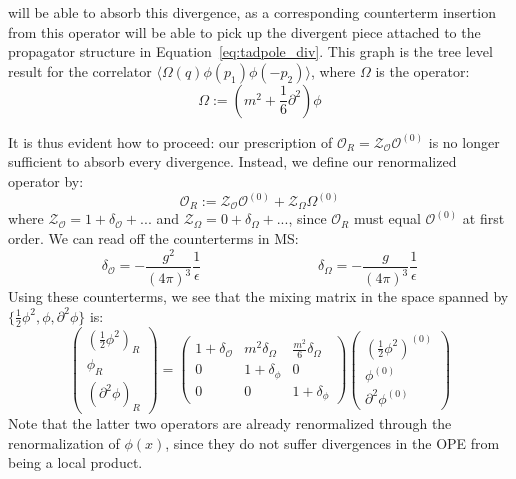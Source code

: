 \documentclass[11pt, oneside]{article}   	%
\theoremstyle{definition}
\begin{document}
will be able to absorb this divergence, as a corresponding counterterm insertion from this operator will be able to pick up 
the divergent piece attached to the propagator structure in Equation~\ref{eq:tadpole_div}. This graph is the tree level 
result for the correlator $\langle \Omega(q) \phi(p_1)\phi(-p_2)\rangle$, where $\Omega$ is the operator:
\begin{equation}
	\Omega := \left(m^2 + \frac{1}{6}\partial^2\right) \phi
\end{equation}

It is thus evident how to proceed: our prescription of $\mathcal O_R = \mathcal Z_\mathcal{O} \mathcal O^{(0)}$ is no 
longer sufficient to absorb every divergence. Instead, we define our renormalized operator by:
\begin{equation}
	\mathcal O_R := \mathcal Z_\mathcal{O} \mathcal O^{(0)} + \mathcal Z_\Omega \Omega^{(0)}
\end{equation}
where $\mathcal Z_\mathcal{O} = 1 + \delta_\mathcal{O} + ... $ and $\mathcal Z_\Omega = 0 + \delta_\Omega + ...$, 
since $\mathcal O_R$ must equal $\mathcal O^{(0)}$ at first order. We can read off the counterterms in MS:
\begin{equation}
	\delta_\mathcal{O} = -\frac{g^2}{(4\pi)^3}\frac{1}{\epsilon} \;\;\;\;\;\;\;\;\;\;\;\;\;\;\;\;\;\;\;\;\;\;\;\;\;\;\;\;\;\;
	\delta_\Omega = -\frac{g}{(4\pi)^3}\frac{1}{\epsilon}
\end{equation}
Using these counterterms, we see that the mixing matrix in the space spanned by $\{\frac{1}{2}\phi^2, \phi, 
\partial^2\phi\}$ is: 
\begin{equation}
	\begin{pmatrix} (\frac{1}{2}\phi^2)_R \\ \phi_R \\ (\partial^2\phi)_R \end{pmatrix} = 
	\begin{pmatrix} 1 + \delta_\mathcal{O} & m^2 \delta_\Omega & \frac{m^2}{6}\delta_\Omega \\ 
	0 & 1 + \delta_\phi & 0 \\ 0 & 0 & 1 + \delta_\phi \end{pmatrix}
	\begin{pmatrix} (\frac{1}{2}\phi^2)^{(0)} \\ \phi^{(0)} \\ \partial^2\phi^{(0)} \end{pmatrix}
\end{equation}
Note that the latter two operators are already renormalized through the renormalization of $\phi(x)$, since they do not 
suffer divergences in the OPE from being a local product. 
\end{document}
